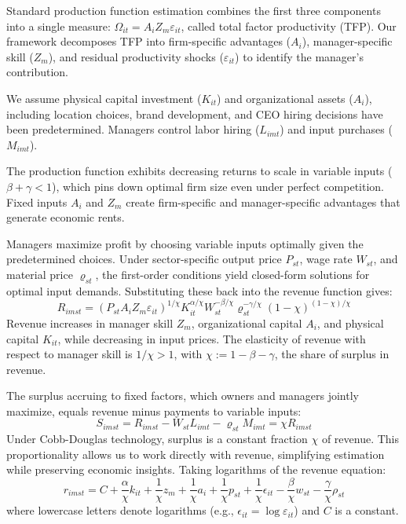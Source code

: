 \documentclass[11pt,a4paper]{article}
\begin{document}
Standard production function estimation combines the first three components into a single measure: $\Omega_{it} = A_i Z_m \varepsilon_{it}$, called total factor productivity (TFP). Our framework decomposes TFP into firm-specific advantages ($A_i$), manager-specific skill ($Z_m$), and residual productivity shocks ($\varepsilon_{it}$) to identify the manager's contribution.

We assume physical capital investment ($K_{it}$) and organizational assets ($A_i$), including location choices, brand development, and CEO hiring decisions have been predetermined. Managers control labor hiring ($L_{imt}$) and input purchases ($M_{imt}$). 

The production function exhibits decreasing returns to scale in variable inputs ($\beta + \gamma < 1$), which pins down optimal firm size even under perfect competition. Fixed inputs $A_i$ and $Z_m$ create firm-specific and manager-specific advantages that generate economic rents.

Managers maximize profit by choosing variable inputs optimally given the predetermined choices. Under sector-specific output price $P_{st}$, wage rate $W_{st}$, and material price $\varrho_{st}$, the first-order conditions yield closed-form solutions for optimal input demands. Substituting these back into the revenue function gives:
\begin{equation}\label{eq:revenue}
R_{imst} = (P_{st}A_i Z_m \varepsilon_{it})^{1/\chi}
K_{it}^{\alpha/\chi}
W_{st}^{-\beta/\chi}
\varrho_{st}^{-\gamma/\chi}
(1-\chi)^{(1-\chi)/\chi}
\end{equation}
Revenue increases in manager skill $Z_m$, organizational capital $A_i$, and physical capital $K_{it}$, while decreasing in input prices. The elasticity of revenue with respect to manager skill is $1/\chi > 1$, with $\chi := 1 - \beta - \gamma$, the share of surplus in revenue. 

The surplus accruing to fixed factors, which owners and managers jointly maximize, equals revenue minus payments to variable inputs:
\begin{equation}\label{eq:surplus}
S_{imst} = R_{imst} - W_{st}L_{imt} - \varrho_{st}M_{imt} = \chi R_{imst}
\end{equation}
Under Cobb-Douglas technology, surplus is a constant fraction $\chi$ of revenue. This proportionality allows us to work directly with revenue, simplifying estimation while preserving economic insights. Taking logarithms of the revenue equation:
\begin{equation}\label{eq:log_revenue}
r_{imst} = C+\frac{\alpha}{\chi} k_{it} + \frac{1}{\chi} z_{m} + \frac{1}{\chi} a_i + \frac{1}{\chi} p_{st} + \frac{1}{\chi}\epsilon_{it} 
- \frac{\beta}{\chi} w_{st} - \frac{\gamma}{\chi} \rho_{st}
\end{equation}
where lowercase letters denote logarithms (e.g., $\epsilon_{it} = \log \varepsilon_{it}$) and $C$ is a constant.
\end{document}
